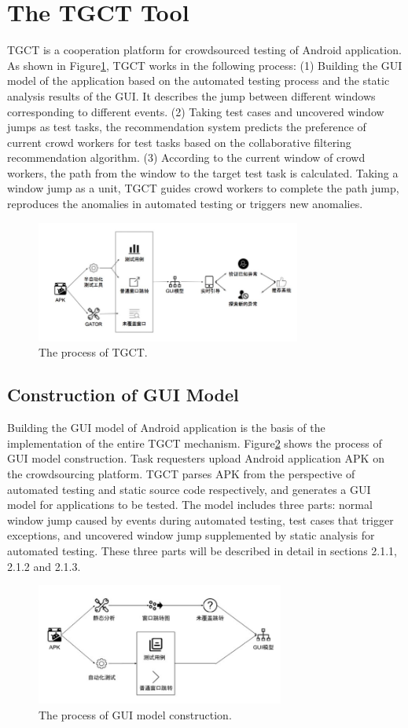 \section{The TGCT Tool}
TGCT is a cooperation platform for crowdsourced testing of Android application. As shown in Figure\ref{fig:arch}, TGCT works in the following process: (1) Building the GUI model of the application based on the automated testing process and the static analysis results of the GUI. It describes the jump between different windows corresponding to different events. (2) Taking test cases and uncovered window jumps as test tasks, the recommendation system predicts the preference of current crowd workers for test tasks based on the collaborative filtering recommendation algorithm. (3) According to the current window of crowd workers, the path from the window to the target test task is calculated. Taking a window jump as a unit, TGCT guides crowd workers to complete the path jump, reproduces the anomalies in automated testing or triggers new anomalies.
\begin{figure}[htbp]
\centering
\centerline{\includegraphics[width=\columnwidth,height=4cm]{fig/2.png}}
\caption{The process of TGCT.}
\label{fig:arch}
\end{figure}

\subsection{Construction of GUI Model}
Building the GUI model of Android application is the basis of the implementation of the entire TGCT mechanism. Figure\ref{fig:flow_chart} shows the process of GUI model construction. Task requesters upload Android application APK on the crowdsourcing platform. TGCT parses APK from the perspective of automated testing and static source code respectively, and generates a GUI model for applications to be tested. The model includes three parts: normal window jump caused by events during automated testing, test cases that trigger exceptions, and uncovered window jump supplemented by static analysis for automated testing. These three parts will be described in detail in sections 2.1.1, 2.1.2 and 2.1.3.
\begin{figure}[htbp]
\centering
\centerline{\includegraphics[width=\columnwidth,height=4cm]{fig/3.png}}
\caption{The process of GUI model construction.}
\label{fig:flow_chart}
\end{figure}

